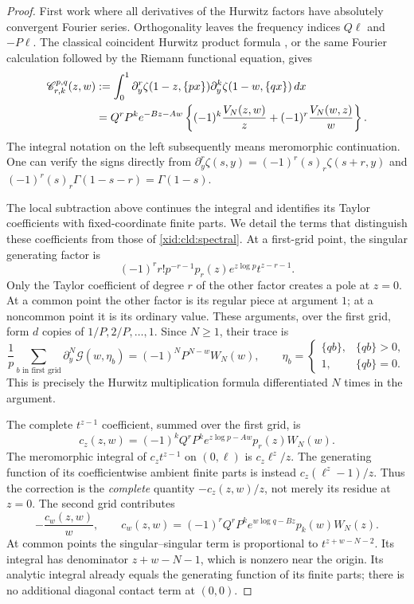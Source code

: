 \documentclass[11pt,a4paper]{article}
\numberwithin{equation}{section}
\theoremstyle{definition}
\theoremstyle{remark}
\begin{document}
\begin{proof}
First work where all derivatives of the Hurwitz factors have absolutely
convergent Fourier series.  Orthogonality leaves the frequency indices
$Q\ell$ and $-P\ell$.  The classical coincident Hurwitz product formula
\cite[Theorem 3.1]{EspinosaMoll1}, or the same Fourier calculation followed
by the Riemann functional equation, gives
\begin{align}
 \mathscr C_{r,k}^{p,q}(z,w)
 &:=\int_0^1
    \partial_y^r\zeta(1-z,\{px\})
    \partial_y^k\zeta(1-w,\{qx\})\,dx\notag\\
 &=Q^rP^ke^{-Bz-Aw}
       \left\{(-1)^k\frac{V_N(z,w)}z
                   +(-1)^r\frac{V_N(w,z)}w\right\}.
 \label{xid:cld:spectral}
\end{align}
The integral notation on the left subsequently means meromorphic
continuation.  One can verify the signs directly from
$\partial_y^r\zeta(s,y)=(-1)^r(s)_r\zeta(s+r,y)$ and
$(-1)^r(s)_r\Gamma(1-s-r)=\Gamma(1-s)$.

The local subtraction above continues the integral and identifies its
Taylor coefficients with fixed-coordinate finite parts.  We detail the
terms that distinguish these coefficients from those of
\eqref{xid:cld:spectral}.  At a first-grid point, the singular generating
factor is
\[
 (-1)^r r!p^{-r-1}p_r(z)e^{z\log p}t^{z-r-1}.
\]
Only the Taylor coefficient of degree $r$ of the other factor creates a
pole at $z=0$.  At a common point the other factor is its regular piece
at argument $1$; at a noncommon point it is its ordinary value.  These
arguments, over the first grid, form $d$ copies of
$1/P,2/P,\ldots,1$.  Since $N\ge1$, their trace is
\[
 \frac1p\sum_{b\text{ in first grid}}
      \partial_y^N\mathscr G(w,\eta_b)
   =(-1)^N P^{N-w}W_N(w),
 \qquad \eta_b=\begin{cases}\{qb\},&\{qb\}>0,\\1,&\{qb\}=0.
                         \end{cases}
\]
This is precisely the Hurwitz multiplication formula differentiated
$N$ times in the argument.

The complete $t^{z-1}$ coefficient, summed over the first grid, is
\[
 c_z(z,w)=(-1)^kQ^rP^k e^{z\log p-Aw}p_r(z)W_N(w).
\]
The meromorphic integral of $c_z t^{z-1}$ on $(0,\ell)$ is
$c_z\ell^z/z$.  The generating function of its coefficientwise
ambient finite parts is instead $c_z(\ell^z-1)/z$.
Thus the correction is the \emph{complete} quantity $-c_z(z,w)/z$,
not merely its residue at $z=0$.  The second grid contributes
\[
 -\frac{c_w(z,w)}w,
 \qquad
 c_w(z,w)=(-1)^rQ^rP^k e^{w\log q-Bz}p_k(w)W_N(z).
\]
At common points the singular--singular term is proportional to
$t^{z+w-N-2}$.  Its integral has denominator $z+w-N-1$, which is
nonzero near the origin.  Its analytic integral already equals the
generating function of its finite parts; there is no additional
diagonal contact term at $(0,0)$.


\end{proof}
\end{document}
